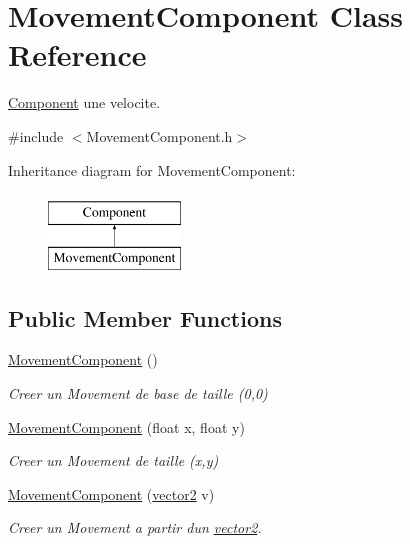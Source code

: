 \hypertarget{class_movement_component}{}\section{Movement\+Component Class Reference}
\label{class_movement_component}


\hyperlink{class_component}{Component} une velocite.  




{\ttfamily \#include $<$Movement\+Component.\+h$>$}

Inheritance diagram for Movement\+Component\+:\begin{figure}[H]
\begin{center}
\leavevmode
\includegraphics[height=2.000000cm]{class_movement_component}
\end{center}
\end{figure}
\subsection*{Public Member Functions}
\begin{DoxyCompactItemize}
\item 
\hypertarget{class_movement_component_a8c22ac85ae143a750b109a0afcd5832f}{}\label{class_movement_component_a8c22ac85ae143a750b109a0afcd5832f} 
\hyperlink{class_movement_component_a8c22ac85ae143a750b109a0afcd5832f}{Movement\+Component} ()
\begin{DoxyCompactList}\small\item\em Creer un Movement de base de taille (0,0) \end{DoxyCompactList}\item 
\hyperlink{class_movement_component_a2fa2f87c3e4cdc69489e5ce06a131fd1}{Movement\+Component} (float x, float y)
\begin{DoxyCompactList}\small\item\em Creer un Movement de taille (x,y) \end{DoxyCompactList}\item 
\hyperlink{class_movement_component_ac9432753c0b29b1206e04c139e56c757}{Movement\+Component} (\hyperlink{structvector2}{vector2} v)
\begin{DoxyCompactList}\small\item\em Creer un Movement a partir d\textquotesingle{}un \hyperlink{structvector2}{vector2}. \end{DoxyCompactList}\end{DoxyCompactItemize}
